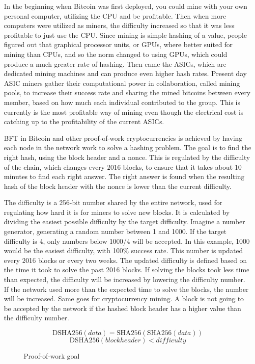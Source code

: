\documentclass[12pt]{article}
\begin{document}
In the beginning when Bitcoin was first deployed, you could mine with your own personal computer, utilizing the CPU and be profitable. Then when more computers were utilized as miners, the difficulty increased so that it was less profitable to just use the CPU. Since mining is  simple hashing of a value, people figured out that graphical processor units, or GPUs, where better suited for mining than CPUs, and so the norm changed to using GPUs, which could produce a much greater rate of hashing. Then came the ASICs, which are dedicated mining machines and can produce even higher hash rates. Present day ASIC miners gather their computational power in collaboration, called mining pools, to increase their success rate and sharing the mined bitcoins between every member, based on how much each individual contributed to the group. This is currently is the most profitable way of mining even though the electrical cost is catching up to the profitability of the current ASICs.

BFT in Bitcoin and other proof-of-work cryptocurrencies is achieved by having each node in the network work to solve a hashing problem. The goal is to find the right hash, using the block header and a nonce. This is regulated by the difficulty of the chain, which changes every 2016 blocks, to ensure that it takes about 10 minutes to find each right answer. The right answer is found when the resulting hash of the block header with the nonce is lower than the current difficulty. 

The difficulty is a 256-bit number shared by the entire network, used for regulating how hard it is for miners to solve new blocks. It is calculated by dividing the easiest possible difficulty by the target difficulty. Imagine a number generator, generating a random number between 1 and 1000. If the target difficulty is 4, only numbers below 1000/4 will be accepted. In this example, 1000 would be the easiest difficulty, with 100\% success rate. This number is updated every 2016 blocks or every two weeks. The updated difficulty is defined based on the time it took to solve the past 2016 blocks. If solving the blocks took less time than expected, the difficulty will be increased by lowering the difficulty number. If the network used more than the expected time to solve the blocks, the number will be increased. Same goes for cryptocurrency mining. A block is not going to be accepted by the network if the hashed block header has a higher value than the difficulty number. 

\begin{figure}[h!]
\begin{equation*}
\textrm{DSHA256}(\mathit{data}) = \textrm{SHA256}(\textrm{SHA256}(\mathit{data}))
\end{equation*}
\begin{equation*}
\textrm{DSHA256}(\mathit{blockheader}) < \mathit{difficulty}
\end{equation*}
\caption{Proof-of-work goal}
\end{figure}
\end{document}
